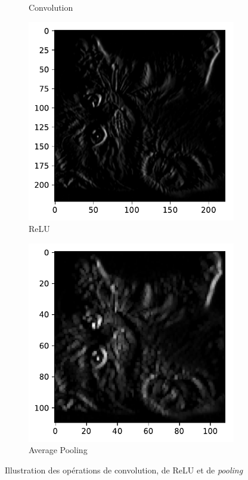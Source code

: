 \begin{figure}[htbp]
\begin{subfigure}{0.24\textwidth}
\caption{Convolution} \label{fig:catconv}
\end{subfigure}
\begin{subfigure}{0.24\textwidth}
\includegraphics[width=\columnwidth]{figures/catRelu.pdf}
\caption{ReLU} \label{fig:catrelu}
\end{subfigure}
\hspace*{\fill}
\begin{subfigure}{0.24\textwidth}
\includegraphics[width=\columnwidth]{figures/catPool.pdf}
\caption{Average Pooling} \label{fig:catpool}
\end{subfigure}


\caption{Illustration des opérations de convolution, de ReLU et de \textit{pooling}}
\label{fig:operationlayer}
\end{figure}



